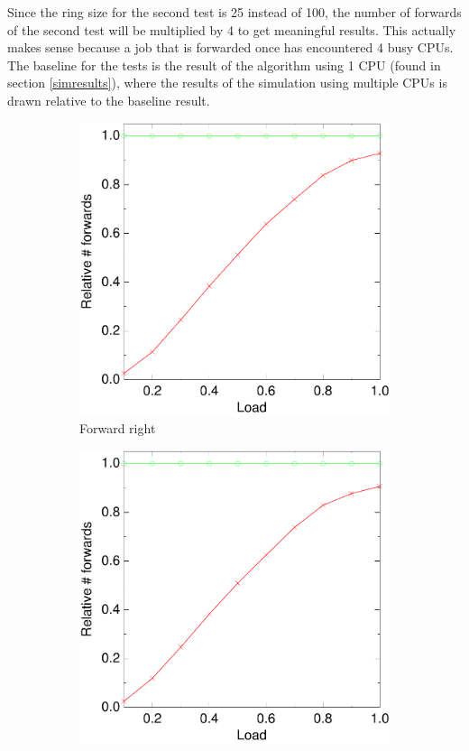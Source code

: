 \documentclass[10pt,a4paper]{article}
\begin{document}
Since the ring size for the second test is 25 instead of 100, the number of forwards of the second test will be multiplied by 4 to get meaningful results. This actually makes sense because a job that is forwarded once has encountered 4 busy CPUs. The baseline for the tests is the result of the algorithm using 1 CPU (found in section \ref{simresults}), where the results of the simulation using multiple CPUs is drawn relative to the baseline result.

\begin{figure}
        \begin{subfigure}[b]{0.5\textwidth}
                \centering
                \includegraphics[width=\textwidth]{data/4rightright.pdf}
                \caption{Forward right}
        \end{subfigure}
        \begin{subfigure}[b]{0.5\textwidth}
                \centering
                \includegraphics[width=\textwidth]{data/4switchswitch.pdf}

\end{subfigure}
\end{figure}
\end{document}

